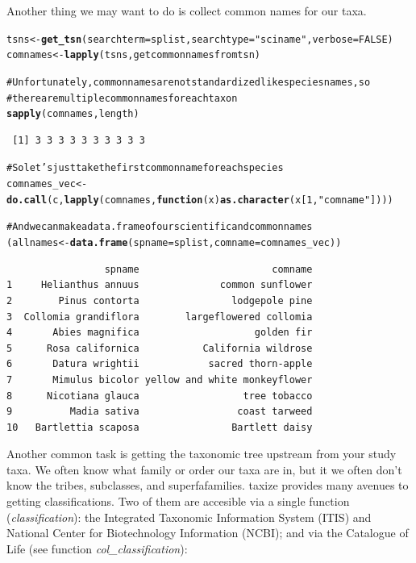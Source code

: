 \documentclass[letterpaper,superscriptaddress,showkeys,longbibliography,10pt]{revtex4-1}\usepackage{graphicx, color}
\makeatletter
\newcommand{\hlfunctioncall}[1]{\textcolor[rgb]{0.501960784313725,0,0.329411764705882}{\textbf{#1}}}%
\newcommand{\hlstring}[1]{\textcolor[rgb]{0.6,0.6,1}{#1}}%
\newcommand{\hlcomment}[1]{\textcolor[rgb]{0.180392156862745,0.6,0.341176470588235}{#1}}%
\newenvironment{kframe}{%
 \def\at@end@of@kframe{}%
 \ifinner\ifhmode%
  \def\at@end@of@kframe{\end{minipage}}%
  \begin{minipage}{\columnwidth}%
 \fi\fi%
 \def\FrameCommand##1{\hskip\@totalleftmargin \hskip-\fboxsep
 \colorbox{shadecolor}{##1}\hskip-\fboxsep
     \hskip-\linewidth \hskip-\@totalleftmargin \hskip\columnwidth}%
 \MakeFramed {\advance\hsize-\width
   \@totalleftmargin\z@ \linewidth\hsize
   \@setminipage}}%
 {\par\unskip\endMakeFramed%
 \at@end@of@kframe}
\newenvironment{knitrout}{}{} %
\makeatother
\begin{document}
Another thing we may want to do is collect common names for our taxa. 

\begin{knitrout}
\color{fgcolor}\begin{kframe}
\begin{alltt}
tsns <- \hlfunctioncall{get_tsn}(searchterm = splist, searchtype = \hlstring{"sciname"}, verbose = FALSE)
comnames <- \hlfunctioncall{lapply}(tsns, getcommonnamesfromtsn)

\hlcomment{# Unfortunately, common names are not standardized like species names, so}
\hlcomment{# there are multiple common names for each taxon}
\hlfunctioncall{sapply}(comnames, length)
\end{alltt}
\begin{verbatim}
 [1] 3 3 3 3 3 3 3 3 3 3
\end{verbatim}
\begin{alltt}

\hlcomment{# So let's just take the first common name for each species}
comnames_vec <- \hlfunctioncall{do.call}(c, \hlfunctioncall{lapply}(comnames, \hlfunctioncall{function}(x) \hlfunctioncall{as.character}(x[1, \hlstring{"comname"}])))

\hlcomment{# And we can make a data.frame of our scientific and common names}
(allnames <- \hlfunctioncall{data.frame}(spname = splist, comname = comnames_vec))
\end{alltt}
\begin{verbatim}
                 spname                       comname
1     Helianthus annuus              common sunflower
2        Pinus contorta                lodgepole pine
3  Collomia grandiflora        largeflowered collomia
4       Abies magnifica                    golden fir
5      Rosa californica           California wildrose
6       Datura wrightii            sacred thorn-apple
7       Mimulus bicolor yellow and white monkeyflower
8      Nicotiana glauca                  tree tobacco
9          Madia sativa                 coast tarweed
10   Bartlettia scaposa                Bartlett daisy
\end{verbatim}
\end{kframe}
\end{knitrout}


Another common task is getting the taxonomic tree upstream from your study taxa. We often know what family or order our taxa are in, but it we often don't know the tribes, subclasses, and superfafamilies. taxize provides many avenues to getting classifications. Two of them are accesible via a single function (\emph{classification}): the Integrated Taxonomic Information System (ITIS) and National Center for Biotechnology Information (NCBI); and via the Catalogue of Life (see function \emph{col\_classification}):
\end{document}
